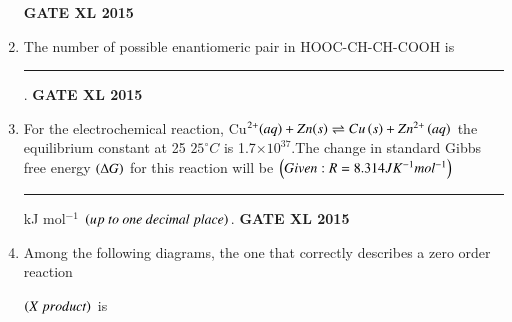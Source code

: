 \documentclass[journal,12pt,onecolumn]{IEEEtran}
\begin{document}
\begin{enumerate}
\begin{enumerate}
    \end{enumerate}
\hfill{\textbf{GATE XL 2015}}
\item The number of possible enantiomeric pair in HOOC-CH-CH-COOH is \rule{1cm}{0.15mm}.
\hfill{\textbf{GATE XL 2015}}
\item For the electrochemical reaction, Cu$^{2+}\textit{\ensuremath{\left(aq\right)}}+Zn\textit{\ensuremath{\left(s\right)}} \rightleftharpoons Cu\left(s\right) +Zn^{2+} \left(aq\right)$ the equilibrium constant at 25 $25^{\circ} C$ is 1.7$\times 10 ^{37}$.The change in standard Gibbs free energy $\left(\Delta G\right)$ for this reaction will be $\left(Given: R = 8.314JK ^ {- 1} mol ^{- 1} \right)$\rule{1cm}{0.15mm} kJ mol$^{-1}$ $\brak{up \ to \ one \ decimal \ place}$.
\hfill{\textbf{GATE XL 2015}}
\item Among the following diagrams, the one that correctly describes a zero order reaction

$\left(X \ product\right)$ is


\end{enumerate}
\end{document}
